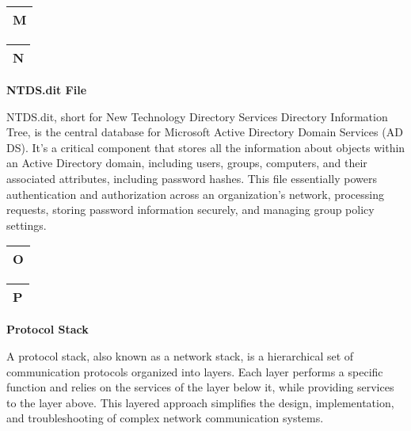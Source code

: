\begin{table}
\justifying

\begin{tabular}{l}
\textbf{M} \\
\hline

\end{tabular}

\end{table}

\begin{table}
\justifying

\begin{tabular}{l}
\textbf{N} \\
\hline

\end{tabular}

\end{table}

\textbf{NTDS.dit File}

NTDS.dit, short for New Technology Directory Services Directory Information Tree, is the central database for Microsoft Active Directory Domain Services (AD DS). It's a critical component that stores all the information about objects within an Active Directory domain, including users, groups, computers, and their associated attributes, including password hashes. This file essentially powers authentication and authorization across an organization's network, processing requests, storing password information securely, and managing group policy settings.

\begin{table}
\justifying

\begin{tabular}{l}
\textbf{O} \\
\hline

\end{tabular}

\end{table}

\begin{table}
\justifying

\begin{tabular}{l}
\textbf{P} \\
\hline

\end{tabular}

\end{table}

\textbf{Protocol Stack}

A protocol stack, also known as a network stack, is a hierarchical set of communication protocols organized into layers. Each layer performs a specific function and relies on the services of the layer below it, while providing services to the layer above. This layered approach simplifies the design, implementation, and troubleshooting of complex network communication systems.

